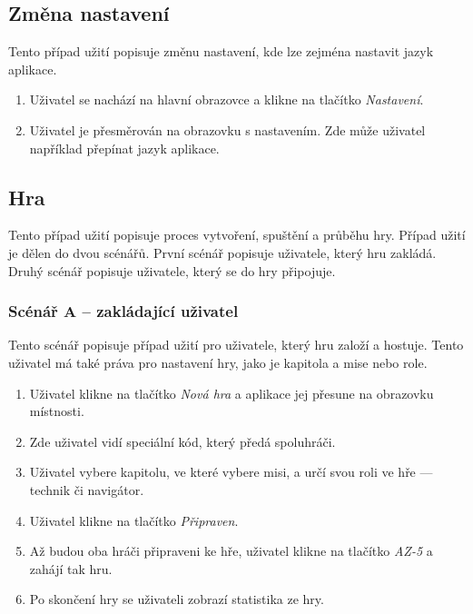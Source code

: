 \subsection{Změna nastavení}

Tento případ užití popisuje změnu nastavení,
kde lze zejména nastavit jazyk aplikace.

\begin{enumerate}
    \item Uživatel se nachází na hlavní obrazovce a klikne na tlačítko
    \emph{Nastavení}.
    \item Uživatel je přesměrován na obrazovku s nastavením.
    Zde může uživatel například přepínat jazyk aplikace.
\end{enumerate}

\subsection{Hra}

Tento případ užití popisuje proces vytvoření, spuštění a průběhu hry.
Případ užití je dělen do dvou scénářů.
První scénář popisuje uživatele,
který hru zakládá.
Druhý scénář popisuje uživatele,
který se do hry připojuje.

\subsubsection*{Scénář A -- zakládající uživatel}

Tento scénář popisuje případ užití pro uživatele,
který hru založí a hostuje.
Tento uživatel má také práva pro nastavení hry,
jako je kapitola a mise nebo role.

\begin{enumerate}
    \item Uživatel klikne na tlačítko \emph{Nová hra}
    a aplikace jej přesune na obrazovku místnosti.
    \item Zde uživatel vidí speciální kód,
    který předá spoluhráči.
    \item Uživatel vybere kapitolu,
    ve které vybere misi,
    a určí svou roli ve hře
    --- technik či navigátor.
    \item Uživatel klikne na tlačítko \emph{Připraven}.
    \item Až budou oba hráči připraveni ke hře,
    uživatel klikne na tlačítko \emph{AZ-5} a zahájí tak hru.
    \item Po skončení hry se uživateli zobrazí statistika ze hry.
\end{enumerate}

